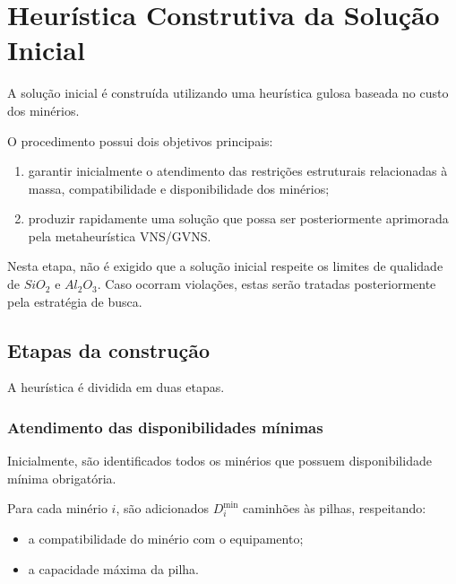 \documentclass[12pt,a4paper]{article}
\begin{document}
\section{Heurística Construtiva da Solução Inicial}

A solução inicial é construída utilizando uma heurística gulosa baseada
no custo dos minérios.

O procedimento possui dois objetivos principais:

\begin{enumerate}

    \item garantir inicialmente o atendimento das restrições estruturais
    relacionadas à massa, compatibilidade e disponibilidade dos minérios;

    \item produzir rapidamente uma solução que possa ser posteriormente
    aprimorada pela metaheurística VNS/GVNS.

\end{enumerate}

Nesta etapa, não é exigido que a solução inicial respeite os limites de
qualidade de $SiO_2$ e $Al_2O_3$. Caso ocorram violações, estas serão
tratadas posteriormente pela estratégia de busca.


\subsection{Etapas da construção}

A heurística é dividida em duas etapas.

\subsubsection{Atendimento das disponibilidades mínimas}

Inicialmente, são identificados todos os minérios que possuem
disponibilidade mínima obrigatória.

Para cada minério $i$, são adicionados $D_i^{\min}$ caminhões às pilhas,
respeitando:

\begin{itemize}

    \item a compatibilidade do minério com o equipamento;

    \item a capacidade máxima da pilha.

\end{itemize}
\end{document}
